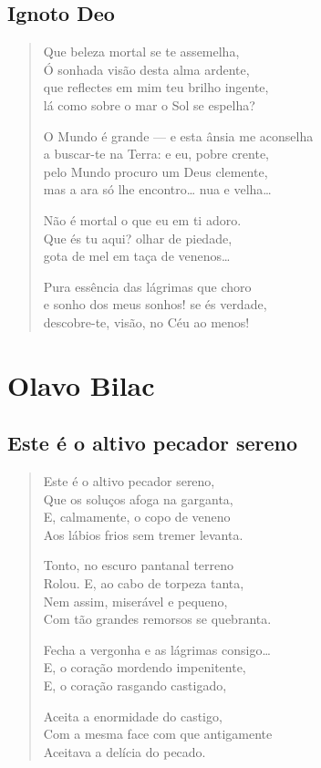 \documentclass[10pt,a5paper,oneside]{book}
\begin{document}
\chapter{Ignoto Deo}

\begin{verse}
Que beleza mortal se te assemelha,\\
Ó sonhada visão desta alma ardente,\\
que reflectes em mim teu brilho ingente,\\
lá como sobre o mar o Sol se espelha?

O Mundo é grande --- e esta ânsia me aconselha\\
a buscar-te na Terra: e eu, pobre crente,\\
pelo Mundo procuro um Deus clemente,\\
mas a ara só lhe encontro\ldots{} nua e velha\ldots{}

Não é mortal o que eu em ti adoro.\\
Que és tu aqui? olhar de piedade,\\
gota de mel em taça de venenos\ldots{}

Pura essência das lágrimas que choro\\
e sonho dos meus sonhos! se és verdade,\\
descobre-te, visão, no Céu ao menos!
\end{verse}

\part{Olavo Bilac}

\chapter{Este é o altivo pecador sereno}

\begin{verse}
Este é o altivo pecador sereno,\\
Que os soluços afoga na garganta,\\
E, calmamente, o copo de veneno\\
Aos lábios frios sem tremer levanta.

Tonto, no escuro pantanal terreno\\
Rolou. E, ao cabo de torpeza tanta,\\
Nem assim, miserável e pequeno,\\
Com tão grandes remorsos se quebranta.

Fecha a vergonha e as lágrimas consigo\ldots{}\\
E, o coração mordendo impenitente,\\
E, o coração rasgando castigado,

Aceita a enormidade do castigo,\\
Com a mesma face com que antigamente\\
Aceitava a delícia do pecado.
\end{verse}
\end{document}
